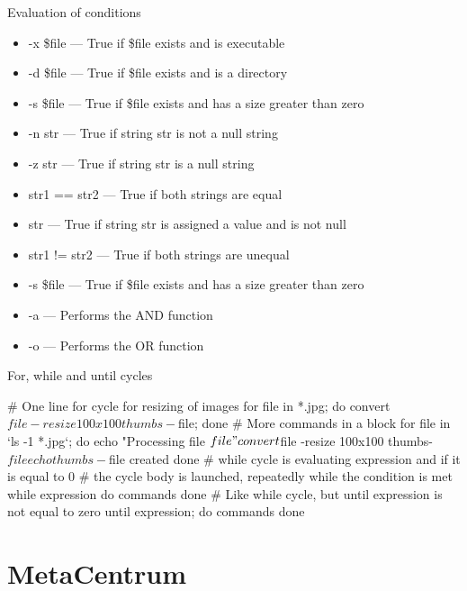 \documentclass[compress, ucs, xelatex, 11pt, xcolor=svgnames,
  hyperref={
    bookmarks=true,
    unicode=true,
    colorlinks=true,
    pdftitle={Linux, command line and MetaCentrum},
    plainpages=false,
    pdfauthor={Vojtech Zeisek},
    pdfsubject={Course about use of Linux command line, writing shell scripts and using MetaCentrum of CESNET},
    pdfcreator={XeLaTeX, http://www.xelatex.org/},
    pdfkeywords={Linux, GNU, BASH, shell, command line, MetaCentrum},
    linkcolor=Sienna,
    anchorcolor=black,
    citecolor=green,
    filecolor=magenta,
    menucolor=Sienna,
    urlcolor=cyan,
    pdftex},
  url={hyphens, lowtilde} %
  ]{beamer}
\begin{document}
\begin{frame}[allowframebreaks]{Evaluation of conditions}
\begin{itemize}
  \item -x \$file --- True if \$file exists and is executable
  \item -d \$file --- True if \$file exists and is a directory
  \item -s \$file --- True if \$file exists and has a size greater than zero
  \item -n str --- True if string str is not a null string
  \item -z str --- True if string str is a null string
  \item str1 == str2 --- True if both strings are equal
  \item str --- True if string str is assigned a value and is not null
  \item str1 != str2 --- True if both strings are unequal
  \item -s \$file --- True if \$file exists and has a size greater than zero
  \item -a --- Performs the AND function
  \item -o --- Performs the OR function
\end{itemize}
\end{frame}

\begin{frame}[fragile]{For, while and until cycles}
  \begin{bashcode}
    # One line for cycle for resizing of images
    for file in *.jpg; do convert $file -resize 100x100 thumbs-$file; done
    # More commands in a block
    for file in `ls -1 *.jpg`; do
      echo "Processing file $file"
      convert $file -resize 100x100 thumbs-$file
      echo thumbs-$file created
      done
    # while cycle is evaluating expression and if it is equal to 0
    # the cycle body is launched, repeatedly while the condition is met
    while expression
      do
        commands
      done
    # Like while cycle, but until expression is not equal to zero
    until expression; do
      commands
      done
  \end{bashcode}
\end{frame}

\section{MetaCentrum}
\end{document}
